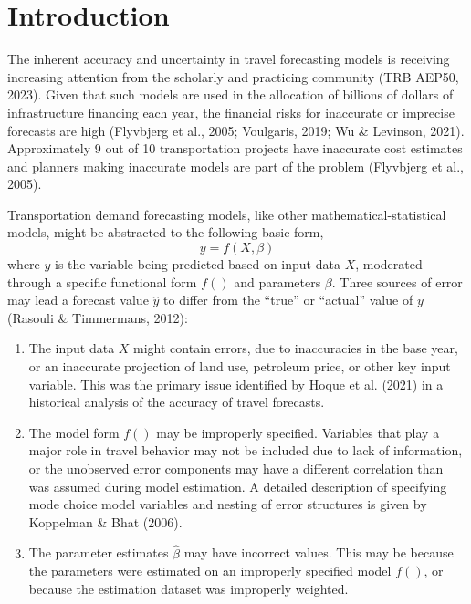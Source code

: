 \documentclass[fancy, masters, twoside]{byuthesis}
\begin{document}
	\tableofcontents
	\cleardoublepage

	\listoffigures
	\cleardoublepage

	\listoftables
	\cleardoublepage

	
	\cleardoublepage

	\mainmatter

\hypertarget{introduction}{%
\chapter{Introduction}\label{introduction}}

The inherent accuracy and uncertainty in travel forecasting models is receiving increasing attention from the scholarly and practicing community (TRB AEP50, 2023). Given that such models are used in the allocation of billions of dollars of infrastructure financing each year, the financial risks for inaccurate or imprecise forecasts are high (Flyvbjerg et al., 2005; Voulgaris, 2019; Wu \& Levinson, 2021). Approximately 9 out of 10 transportation projects have inaccurate cost estimates and planners making inaccurate models are part of the problem (Flyvbjerg et al., 2005).

Transportation demand forecasting models, like other mathematical-statistical models, might be abstracted to the following basic form,
\begin{equation}
y = f(X, \beta)
\end{equation}
where \(y\) is the variable being predicted based on input data \(X\), moderated through a specific functional form \(f()\) and parameters \(\beta\). Three sources of error may lead a forecast value \(\hat{y}\) to differ from the ``true'' or ``actual'' value of \(y\) (Rasouli \& Timmermans, 2012):

\begin{enumerate}
\def\labelenumi{\arabic{enumi}.}
\item
  The input data \(X\) might contain errors, due to inaccuracies in the base year, or an inaccurate projection of land use, petroleum price, or other key input variable. This was the primary issue identified by Hoque et al. (2021) in a historical analysis of the accuracy of travel forecasts.
\item
  The model form \(f()\) may be improperly specified. Variables that play a major role in travel behavior may not be included due to lack of information, or the unobserved error components may have a different correlation than was assumed during model estimation. A detailed description of specifying mode choice model variables and nesting of error structures is given by Koppelman \& Bhat (2006).
\item
  The parameter estimates \(\hat{\beta}\) may have incorrect values. This may be because the parameters were estimated on an improperly specified model \(f()\), or because the estimation dataset was improperly weighted.
\end{enumerate}
\end{document}
